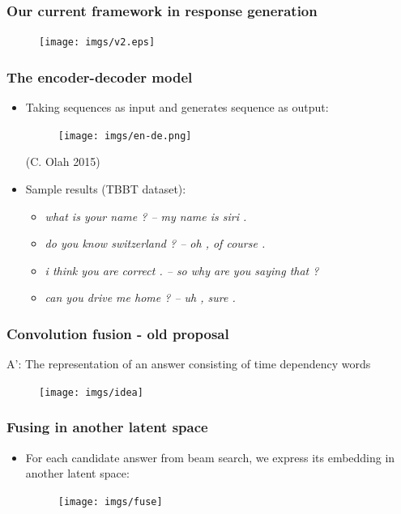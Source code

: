 \documentclass{beamer}
\begin{document}
\begin{frame}
\frametitle{Our current framework in response generation}
\begin{figure}
\centering
\texttt{[image: imgs/v2.eps]}
\end{figure}
\end{frame}

\begin{frame}
\frametitle{The encoder-decoder model}
\begin{itemize}
\item Taking sequences as input and generates sequence as output:
\begin{figure}
\centering
\hspace{-1cm}\texttt{[image: imgs/en-de.png]}
\end{figure}
\hspace{9cm}\tiny{(C. Olah 2015)}
\end{itemize}
\begin{itemize}
\item Sample results (TBBT dataset):
\begin{itemize}
\item \emph{what is your name ? -- my name is siri .}
\item \emph{do you know switzerland ? -- oh , of course .}
\item \emph{i think you are correct . -- so why are you saying that ?}
\item \emph{can you drive me home ? -- uh , sure .}
\end{itemize}
\end{itemize}
\end{frame}
\begin{frame}
\frametitle{Convolution fusion - old proposal}
A': The representation of an answer consisting of time dependency words

  \begin{figure}
      \centering
      \hspace{-1cm}\texttt{[image: imgs/idea]}
  \end{figure}
\end{frame}

\begin{frame}
\frametitle{Fusing in another latent space}
\begin{itemize}
\item For each candidate answer from beam search, we express its embedding in another latent space:
  \begin{figure}
      \centering
      \hspace{-1cm}\texttt{[image: imgs/fuse]}
  \end{figure}
\end{itemize}
\end{frame}
\end{document}
